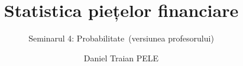 \title[Statistica piețelor financiare]{Statistica piețelor financiare}
\subtitle{Seminarul 4: Probabilitate\ifsolutions\ (versiunea profesorului)\fi}
\author[D.T. Pele]{Daniel Traian PELE}
\date{}

\providecommand{\sfmapplink}[3]{\hypertarget{#2}{}\hyperlink{#1}{\beamergotobutton{#3}}}  %
\providecommand{\sfmappback}[2]{\begin{tikzpicture}[remember picture,overlay]\node[anchor=south east] at ([xshift=-3mm,yshift=7mm]current page.south east){\hyperlink{#1}{\beamerreturnbutton{#2}}};\end{tikzpicture}}  %
\providecommand{\sfmchlink}[2]{\href{#1}{#2}}  %
\providecommand{\sfmchlinkt}[2]{\href{#1}{\usebeamercolor[fg]{frametitle}#2}}  %


